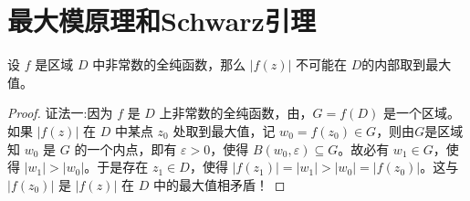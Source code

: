 \documentclass[../../main.tex]{subfiles}%
\begin{document}
\section{最大模原理和Schwarz引理}

\begin{theorem}[最大模原理]\label{theorem:最大模原理-定理4.5.1}
设 \( f \) 是区域 \( D \) 中非常数的全纯函数，那么 \( |f(z)| \) 不可能在 \( D \)的内部取到最大值。
\end{theorem}
\begin{proof}

{\color{blue}证法一:}因为 \( f \) 是 \( D \) 上非常数的全纯函数，由，\( G = f(D) \) 是一个区域。如果 \( |f(z)| \) 在 \( D \) 中某点 \( z_0 \) 处取到最大值，记 \( w_0 = f(z_0)\in G \)，则由$G$是区域知 \( w_0 \) 是 \( G \) 的一个内点，即有 \( \varepsilon > 0 \)，使得 \( B(w_0, \varepsilon) \subseteq G \)。故必有 \( w_1 \in G \)，使得 \( |w_1| > |w_0| \)。于是存在 \( z_1 \in D \)，使得 \( |f(z_1)| = |w_1| > |w_0| = |f(z_0)| \)。这与 \( |f(z_0)| \) 是 \( |f(z)| \) 在 \( D \) 中的最大值相矛盾！


\end{proof}
\end{document}
